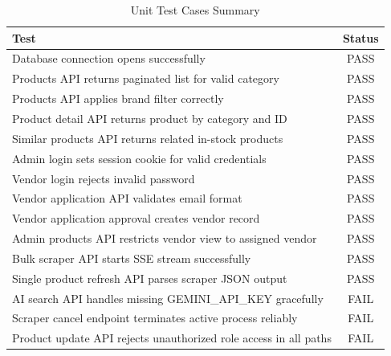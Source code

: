 \begin{table}[h!]
\centering
\caption{Unit Test Cases Summary}
\begin{tabular}{|p{10cm}|c|}
\hline
\textbf{Test} & \textbf{Status} \\
\hline
Database connection opens successfully & PASS \\
\hline
Products API returns paginated list for valid category & PASS \\
\hline
Products API applies brand filter correctly & PASS \\
\hline
Product detail API returns product by category and ID & PASS \\
\hline
Similar products API returns related in-stock products & PASS \\
\hline
Admin login sets session cookie for valid credentials & PASS \\
\hline
Vendor login rejects invalid password & PASS \\
\hline
Vendor application API validates email format & PASS \\
\hline
Vendor application approval creates vendor record & PASS \\
\hline
Admin products API restricts vendor view to assigned vendor & PASS \\
\hline
Bulk scraper API starts SSE stream successfully & PASS \\
\hline
Single product refresh API parses scraper JSON output & PASS \\
\hline
AI search API handles missing GEMINI\_API\_KEY gracefully & FAIL \\
\hline
Scraper cancel endpoint terminates active process reliably & FAIL \\
\hline
Product update API rejects unauthorized role access in all paths & FAIL \\
\hline
\end{tabular}
\end{table}

